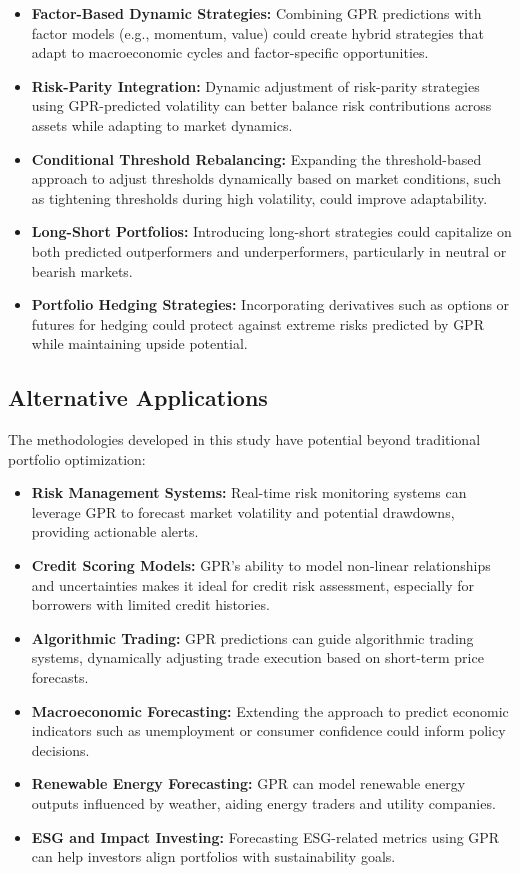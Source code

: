 \begin{itemize}
    \item \textbf{Factor-Based Dynamic Strategies:} Combining GPR predictions with factor models (e.g., momentum, value) could create hybrid strategies that adapt to macroeconomic cycles and factor-specific opportunities.
    \item \textbf{Risk-Parity Integration:} Dynamic adjustment of risk-parity strategies using GPR-predicted volatility can better balance risk contributions across assets while adapting to market dynamics.
    \item \textbf{Conditional Threshold Rebalancing:} Expanding the threshold-based approach to adjust thresholds dynamically based on market conditions, such as tightening thresholds during high volatility, could improve adaptability.
    \item \textbf{Long-Short Portfolios:} Introducing long-short strategies could capitalize on both predicted outperformers and underperformers, particularly in neutral or bearish markets.
    \item \textbf{Portfolio Hedging Strategies:} Incorporating derivatives such as options or futures for hedging could protect against extreme risks predicted by GPR while maintaining upside potential.
\end{itemize}

\subsection{Alternative Applications}
The methodologies developed in this study have potential beyond traditional portfolio optimization:

\begin{itemize}
    \item \textbf{Risk Management Systems:} Real-time risk monitoring systems can leverage GPR to forecast market volatility and potential drawdowns, providing actionable alerts.
    \item \textbf{Credit Scoring Models:} GPR's ability to model non-linear relationships and uncertainties makes it ideal for credit risk assessment, especially for borrowers with limited credit histories.
    \item \textbf{Algorithmic Trading:} GPR predictions can guide algorithmic trading systems, dynamically adjusting trade execution based on short-term price forecasts.
    \item \textbf{Macroeconomic Forecasting:} Extending the approach to predict economic indicators such as unemployment or consumer confidence could inform policy decisions.
    \item \textbf{Renewable Energy Forecasting:} GPR can model renewable energy outputs influenced by weather, aiding energy traders and utility companies.
    \item \textbf{ESG and Impact Investing:} Forecasting ESG-related metrics using GPR can help investors align portfolios with sustainability goals.
\end{itemize}

